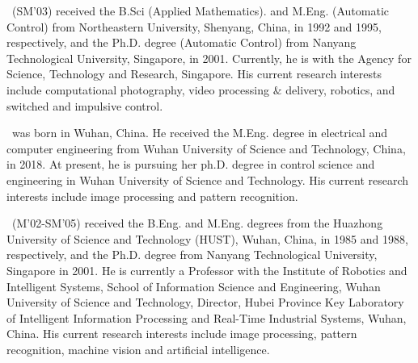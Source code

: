 \documentclass[a4paper,fleqn]{cas-dc}
\begin{document}
\par\noindent 
\parbox[t]{\linewidth}{
	 \ (SM’03) received the B.Sci (Applied Mathematics). and M.Eng. (Automatic Control) from Northeastern University, Shenyang, China, in 1992 and 1995, respectively, and the Ph.D. degree (Automatic Control) from Nanyang Technological University, Singapore, in 2001. Currently, he is with the Agency for Science, Technology and Research, Singapore. His current research interests include computational photography, video processing $\&$ delivery, robotics, and switched and impulsive control.}
\vspace{1\baselineskip}

\par\noindent 
\parbox[t]{\linewidth}{
	 \ was born in Wuhan, China. He received the M.Eng. degree in electrical and computer engineering from Wuhan University of Science and Technology, China, in 2018. At present, he is pursuing her ph.D. degree in control science and engineering in Wuhan University of Science and Technology. His current research interests include image processing and pattern recognition.}
\vspace{1\baselineskip}

\par\noindent 
\parbox[t]{\linewidth}{
	 \ (M’02-SM’05) received the B.Eng. and M.Eng. degrees from the Huazhong University of Science and Technology (HUST), Wuhan, China, in 1985 and 1988, respectively, and the Ph.D. degree from Nanyang Technological University, Singapore in 2001. He is currently a Professor with the Institute of Robotics and Intelligent Systems, School of Information Science and Engineering, Wuhan University of Science and Technology, Director, Hubei Province Key Laboratory of Intelligent Information Processing and Real-Time Industrial Systems, Wuhan, China. His current research interests include image processing, pattern recognition, machine vision and artificial intelligence.}
\vspace{1\baselineskip}
\end{document}
